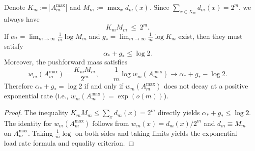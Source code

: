 \begin{conclusion}[Extremal--degeneracy inequality: rigidity of \texorpdfstring{$\alpha_\ast+g_\ast\le \log2$}{alpha*+g*<=log2} and exponential load rate of the maximal set]\label{con:xi-terminal-extreme-degeneracy-inequality}
Denote \(K_m:=|A_m^{\max}|\) and \(M_m:=\max_x d_m(x)\).
Since \(\sum_{x\in X_m}d_m(x)=2^m\), we always have
\[
K_m M_m\ \le\ 2^m.
\]
If \(\alpha_\ast=\lim_{m\to\infty}\frac{1}{m}\log M_m\) and \(g_\ast=\lim_{m\to\infty}\frac{1}{m}\log K_m\) exist, then they must satisfy
\[
\alpha_\ast+g_\ast\le\log2.
\]
Moreover, the pushforward mass satisfies
\[
w_m(A_m^{\max})=\frac{K_mM_m}{2^m},
\qquad
\frac{1}{m}\log w_m(A_m^{\max})\longrightarrow \alpha_\ast+g_\ast-\log2.
\]
Therefore \(\alpha_\ast+g_\ast=\log2\) if and only if \(w_m(A_m^{\max})\) does not decay at a positive exponential rate (i.e., \(w_m(A_m^{\max})=\exp(o(m))\)).
\end{conclusion}
\begin{proof}
The inequality \(K_mM_m\le\sum_x d_m(x)=2^m\) directly yields \(\alpha_\ast+g_\ast\le\log2\).
The identity for \(w_m(A_m^{\max})\) follows from \(w_m(x)=d_m(x)/2^m\) and \(d_m\equiv M_m\) on \(A_m^{\max}\).
Taking \(\frac1m\log\) on both sides and taking limits yields the exponential load rate formula and equality criterion.
\end{proof}

